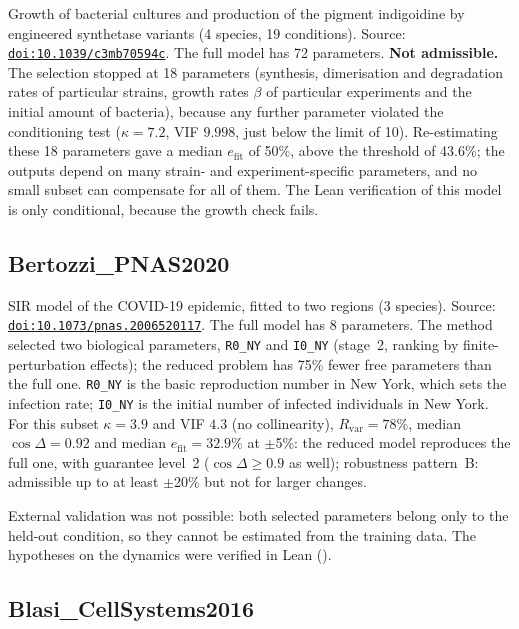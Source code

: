 Growth of bacterial cultures and production of the pigment indigoidine by engineered synthetase variants (4 species, 19 conditions). Source: \href{https://doi.org/10.1039/c3mb70594c}{\nolinkurl{doi:10.1039/c3mb70594c}}. The full model has 72 parameters. \textbf{Not admissible.} The selection stopped at 18 parameters (synthesis, dimerisation and degradation rates of particular strains, growth rates $\beta$ of particular experiments and the initial amount of bacteria), because any further parameter violated the conditioning test ($\kappa=7.2$, VIF $9.998$, just below the limit of 10). Re-estimating these 18 parameters gave a median $e_{\mathrm{fit}}$ of 50\%, above the threshold of 43.6\%; the outputs depend on many strain- and experiment-specific parameters, and no small subset can compensate for all of them. The Lean verification of this model is only conditional, because the growth check fails.

\subsection*{Bertozzi\_PNAS2020}

SIR model of the COVID-19 epidemic, fitted to two regions (3 species). Source: \href{https://doi.org/10.1073/pnas.2006520117}{\nolinkurl{doi:10.1073/pnas.2006520117}}. The full model has 8 parameters. The method selected two biological parameters, \texttt{R0\_NY} and \texttt{I0\_NY} (stage~2, ranking by finite-perturbation effects); the reduced problem has 75\% fewer free parameters than the full one. \texttt{R0\_NY} is the basic reproduction number in New York, which sets the infection rate; \texttt{I0\_NY} is the initial number of infected individuals in New York. For this subset $\kappa=3.9$ and VIF $4.3$ (no collinearity), $R_{\mathrm{var}}=78\%$, median $\cos\Delta=0.92$ and median $e_{\mathrm{fit}}=32.9\%$ at $\pm$5\%: the reduced model reproduces the full one, with guarantee level~2 ($\cos\Delta\ge0.9$ as well); robustness pattern~B: admissible up to at least $\pm$20\% but not for larger changes.

External validation was not possible: both selected parameters belong only to the held-out condition, so they cannot be estimated from the training data. The hypotheses on the dynamics were verified in Lean ().

\subsection*{Blasi\_CellSystems2016}

